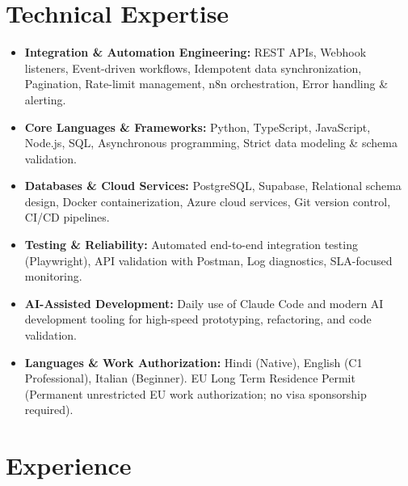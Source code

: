 \documentclass[10pt,a4paper]{article}
\begin{document}
\section{Technical Expertise}
\begin{itemize}
  \item \textbf{Integration \& Automation Engineering:} REST APIs, Webhook listeners, Event-driven workflows, Idempotent data synchronization, Pagination, Rate-limit management, n8n orchestration, Error handling \& alerting.
  \item \textbf{Core Languages \& Frameworks:} Python, TypeScript, JavaScript, Node.js, SQL, Asynchronous programming, Strict data modeling \& schema validation.
  \item \textbf{Databases \& Cloud Services:} PostgreSQL, Supabase, Relational schema design, Docker containerization, Azure cloud services, Git version control, CI/CD pipelines.
  \item \textbf{Testing \& Reliability:} Automated end-to-end integration testing (Playwright), API validation with Postman, Log diagnostics, SLA-focused monitoring.
  \item \textbf{AI-Assisted Development:} Daily use of Claude Code and modern AI development tooling for high-speed prototyping, refactoring, and code validation.
  \item \textbf{Languages \& Work Authorization:} Hindi (Native), English (C1 Professional), Italian (Beginner). EU Long Term Residence Permit (Permanent unrestricted EU work authorization; no visa sponsorship required).
\end{itemize}

\section{Experience}
\end{document}
